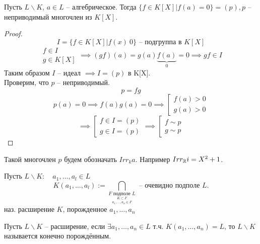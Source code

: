 \documentclass[main]{subfiles}
\begin{document}
\begin{proposition}
    Пусть $L \backslash K$, $a \in L$ -- алгебрическое. Тогда $ \{ f \in K[X] | f(a) = 0 \} = (p),
    p$ -- неприводимый многочлен из $K[X]$.
\end{proposition}
\begin{proof}
    \[ I = \{ f \in K[X] | f(x) \ 0 \} \text{ -- подгруппа в } K[X] \]
     \[ \left.
    \begin{gathered}
        f \in I \\
        g \in K[X]
    \end{gathered} \right. \implies (gf)(a) = g(a)\underbrace{f(a)}_{0} = 0 \implies gf \in I \] 
    Таким образом $I$ -- идеал $\implies I = (p)$ в K[X]. \\
    Проверим, что $p$ -- неприводимый.
    \[ p = fg \] 
    \[p(a) = 0 \implies f(a)g(a) = 0 \implies \left[ \begin{gathered}
        f(a) > 0 \\
        g(a) > 0
    \end{gathered} \right. \]
    \[ \implies \left[ \begin{gathered}
        f \in I = (p) \\
        g \in I = (p)
    \end{gathered} \right. \implies \left[ \begin{gathered}
        f \sim p \\
        g \sim p
    \end{gathered} \right. \]
\end{proof}
Такой многочлен $p$ будем обозначать $Irr_k a$. Например $Irr_{\mathbb{R}} i = X^2 + 1$. \\

\begin{definition}
    Пусть $L \backslash K : \quad a_1, \ldots, a_l \in L$ \\
    \[K(a_1, \ldots, a_l) := \bigcap_{\underset{a_1, \ldots, a_n \in F}{\underset{K \subset F}{F \text{ подполе } L}}}
    \text{ -- очевидно подполе } L. \]
    наз. расширение $K$, порожденное $a_1, \ldots, a_n$
\end{definition}

\begin{definition}
    Пусть $L \backslash K$ -- расширение, если $\exists a_1, \ldots, a_n \in L$ т.ч.
    $K(a_1, \ldots, a_n) = L$, то $L \backslash K $ называется конечно порождённым.
\end{definition}
\end{document}
